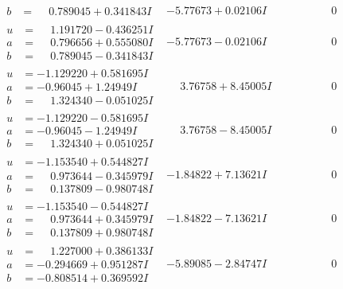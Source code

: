 \documentclass[1p]{elsarticle_modified}
\theoremstyle{definition}
\begin{document}
$$\begin{array}{c|c|c}
\begin{aligned}
b &= \phantom{-}0.789045 + 0.341843 I\end{aligned}
 & -5.77673 + 0.02106 I & \phantom{-0.000000 } 0 \\ \hline\begin{aligned}
u &= \phantom{-}1.191720 - 0.436251 I \\
a &= \phantom{-}0.796656 + 0.555080 I \\
b &= \phantom{-}0.789045 - 0.341843 I\end{aligned}
 & -5.77673 - 0.02106 I & \phantom{-0.000000 } 0 \\ \hline\begin{aligned}
u &= -1.129220 + 0.581695 I \\
a &= -0.96045 + 1.24949 I \\
b &= \phantom{-}1.324340 - 0.051025 I\end{aligned}
 & \phantom{-}3.76758 + 8.45005 I & \phantom{-0.000000 } 0 \\ \hline\begin{aligned}
u &= -1.129220 - 0.581695 I \\
a &= -0.96045 - 1.24949 I \\
b &= \phantom{-}1.324340 + 0.051025 I\end{aligned}
 & \phantom{-}3.76758 - 8.45005 I & \phantom{-0.000000 } 0 \\ \hline\begin{aligned}
u &= -1.153540 + 0.544827 I \\
a &= \phantom{-}0.973644 - 0.345979 I \\
b &= \phantom{-}0.137809 - 0.980748 I\end{aligned}
 & -1.84822 + 7.13621 I & \phantom{-0.000000 } 0 \\ \hline\begin{aligned}
u &= -1.153540 - 0.544827 I \\
a &= \phantom{-}0.973644 + 0.345979 I \\
b &= \phantom{-}0.137809 + 0.980748 I\end{aligned}
 & -1.84822 - 7.13621 I & \phantom{-0.000000 } 0 \\ \hline\begin{aligned}
u &= \phantom{-}1.227000 + 0.386133 I \\
a &= -0.294669 + 0.951287 I \\
b &= -0.808514 + 0.369592 I\end{aligned}
 & -5.89085 - 2.84747 I & \phantom{-0.000000 } 0 \\ \hline\begin{aligned}

\end{aligned}
\end{array}$$
\end{document}
